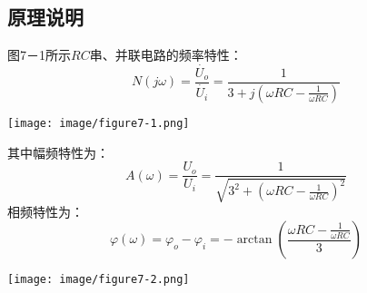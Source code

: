 \documentclass[UTF8]{article}
\begin{document}
        \subsection{原理说明}
            \begin{adjustwidth}{0em}{0em}
                \begin{minipage}[H]{0.55\textwidth}
                    \noindent\hspace{2em}图7－1所示$RC$串、并联电路的频率特性：
                    \begin{equation*}
                        N(j\omega) = \frac{\dot{U_o}}{\dot{U_i}} = \frac{1}{3+j\left( \omega RC -\frac{1}{\omega RC}\right)}
                    \end{equation*}
                \end{minipage}
                \begin{minipage}[H]{0.4\textwidth}
                    \centering
                    \texttt{[image: image/figure7-1.png]}
                \end{minipage}
            \end{adjustwidth}
            \begin{adjustwidth}{0em}{0em}
                \begin{minipage}[H]{0.5\textwidth}
                    \noindent\hspace{2em}其中幅频特性为：
                    \begin{equation*}
                        A(\omega) = \frac{U_o}{U_i}
                        = \frac{1}{\sqrt{3^2 +\left( \omega RC - \frac{1}{\omega RC}\right)^2}}
                    \end{equation*}
                    \noindent\hspace{2em}相频特性为：
                    \begin{equation*}
                        \varphi(\omega) = \varphi_o - \varphi_i
                        = - \arctan \left( \frac{\omega RC - \frac{1}{\omega RC}}{3}\right)
                    \end{equation*}
                \end{minipage}
                \begin{minipage}[H]{0.4\textwidth}
                    \centering
                    \texttt{[image: image/figure7-2.png]}
                \end{minipage}

            \end{adjustwidth}
\end{document}
